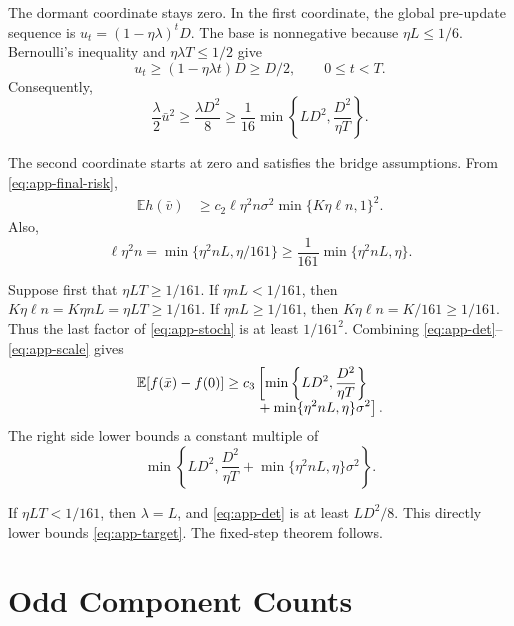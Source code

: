 \documentclass[twoside]{article}
\newcommand{\E}{\mathbb E}
\begin{document}
The dormant coordinate stays zero. In the first coordinate, the global
pre-update sequence is $u_t=(1-\eta\lambda)^tD$. The base is nonnegative
because $\eta L\le1/6$. Bernoulli's inequality and
$\eta\lambda T\le1/2$ give
\begin{equation}
 u_t\ge(1-\eta\lambda t)D\ge D/2,
 \qquad 0\le t<T.
\end{equation}
Consequently,
\begin{equation}
 \frac\lambda2\bar u^2
 \ge\frac{\lambda D^2}{8}
 \ge\frac1{16}\min\left\{LD^2,\frac{D^2}{\eta T}\right\}.     \label{eq:app-det}
\end{equation}

The second coordinate starts at zero and satisfies the bridge assumptions.
From \eqref{eq:app-final-risk},
\begin{align}
 \E h(\bar v)
 &\ge c_2\ell\eta^2n\sigma^2
 \min\{K\eta\ell n,1\}^2.                         \label{eq:app-stoch}
\end{align}
Also,
\begin{equation}
 \ell\eta^2n
 =\min\{\eta^2nL,\eta/161\}
 \ge\frac1{161}\min\{\eta^2nL,\eta\}.             \label{eq:app-scale}
\end{equation}

Suppose first that $\eta LT\ge1/161$. If $\eta nL<1/161$, then
$K\eta\ell n=K\eta nL=\eta LT\ge1/161$. If
$\eta nL\ge1/161$, then $K\eta\ell n=K/161\ge1/161$. Thus the last factor
of \eqref{eq:app-stoch} is at least $1/161^2$. Combining
\eqref{eq:app-det}--\eqref{eq:app-scale} gives
\begin{align}
 \E[f(\bar x)-f(0)]
 \ge c_3\left[\min\left\{LD^2,\frac{D^2}{\eta T}\right\}\right.\quad\notag\\[-1ex]
 \left.{}+\min\{\eta^2nL,\eta\}\sigma^2\right].    \label{eq:app-case-one}
\end{align}
The right side lower bounds a constant multiple of
\begin{equation}
 \min\left\{LD^2,
 \frac{D^2}{\eta T}+\min\{\eta^2nL,\eta\}\sigma^2\right\}.
 \label{eq:app-target}
\end{equation}

If $\eta LT<1/161$, then $\lambda=L$, and
\eqref{eq:app-det} is at least $LD^2/8$. This directly lower bounds
\eqref{eq:app-target}. The fixed-step theorem follows.

\section{Odd Component Counts}
\label{app:odd}
\end{document}
